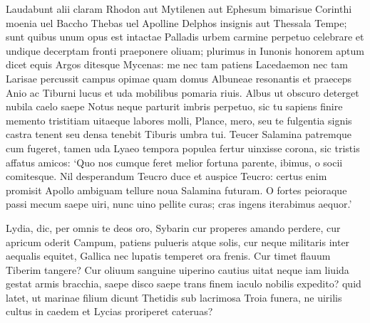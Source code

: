 \documentclass{book}
\newenvironment {carmen} [1] [\relax] 
  {\Titulus \Versus \incipit*\numerus{1}#1}
  {\endVersus}
\newcommand {\SapphicII} {\Forma \strophae {2 \poena 0}}
\newcommand {\Alcm}      {\Forma \strophae {0 \poena 2}}
\begin{document}
\begin{carmen}[\Alcm]

 Laudabunt alii claram Rhodon aut Mytilenen  
      aut Ephesum bimarisue Corinthi
 moenia uel Baccho Thebas uel Apolline Delphos
      insignis aut Thessala Tempe;
 sunt quibus unum opus est intactae Palladis urbem               
      carmine perpetuo celebrare et
 undique decerptam fronti praeponere oliuam;
      plurimus in Iunonis honorem
 aptum dicet equis Argos ditesque Mycenas:
       me nec tam patiens Lacedaemon               
 nec tam Larisae percussit campus opimae
      quam domus Albuneae resonantis
 et praeceps Anio ac Tiburni lucus et uda
      mobilibus pomaria riuis.
 Albus ut obscuro deterget nubila caelo               
      saepe Notus neque parturit imbris
 perpetuo, sic tu sapiens finire memento
      tristitiam uitaeque labores
 molli, Plance, mero, seu te fulgentia signis
       castra tenent seu densa tenebit               
 Tiburis umbra tui. Teucer Salamina patremque
      cum fugeret, tamen uda Lyaeo
 tempora populea fertur uinxisse corona,
      sic tristis affatus amicos:
 `Quo nos cumque feret melior fortuna parente,               
      ibimus, o socii comitesque.
 Nil desperandum Teucro duce et auspice Teucro:
      certus enim promisit Apollo
 ambiguam tellure noua Salamina futuram.
       O fortes peioraque passi
 mecum saepe uiri, nunc uino pellite curas;               
      cras ingens iterabimus aequor.' 

\end{carmen}

\begin{carmen}[\SapphicII]


      Lydia, dic, per omnis
 te deos oro, Sybarin cur properes amando
      perdere, cur apricum
 oderit Campum, patiens pulueris atque solis,
       cur neque militaris               
 inter aequalis equitet, Gallica nec lupatis
      temperet ora frenis.
 Cur timet flauum Tiberim tangere? Cur oliuum 
      sanguine uiperino
 cautius uitat neque iam liuida gestat armis               
      bracchia, saepe disco
 saepe trans finem iaculo nobilis expedito?
      quid latet, ut marinae
 filium dicunt Thetidis sub lacrimosa Troia
       funera, ne uirilis               
 cultus in caedem et Lycias proriperet cateruas? 

\end{carmen}
\end{document}
